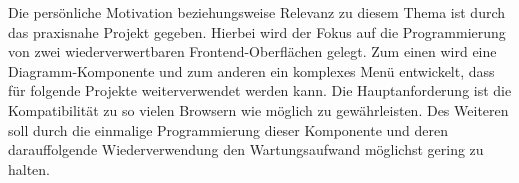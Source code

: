 Die persönliche Motivation beziehungsweise Relevanz zu diesem Thema ist durch das praxisnahe Projekt gegeben. Hierbei wird der Fokus auf die Programmierung von zwei wiederverwertbaren Frontend-Oberflächen gelegt. Zum einen wird eine Diagramm-Komponente und zum anderen ein komplexes Menü entwickelt, dass für folgende Projekte weiterverwendet werden kann. Die Hauptanforderung ist die Kompatibilität zu so vielen Browsern wie möglich zu gewährleisten. Des Weiteren soll durch die einmalige Programmierung dieser Komponente und deren darauffolgende Wiederverwendung den Wartungsaufwand möglichst gering zu halten.



